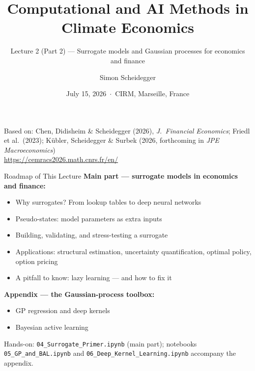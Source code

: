 \documentclass[aspectratio=169,11pt]{beamer}
\title[CEMRACS 2026 $\cdot$ Surrogates]
{Computational and AI Methods in Climate Economics}
\subtitle{Lecture 2 (Part 2) --- Surrogate models and Gaussian processes for economics and finance}
\author{Simon Scheidegger}
\institute{HEC Lausanne $\cdot$ Grantham Research Institute, LSE}
\date{July 15, 2026 \,$\cdot$\, CIRM, Marseille, France}
\newcommand{\emphc}[1]{\textcolor{harvardcrimson}{#1}}
\begin{document}
\newcommand{\exercisepause}{%
  \tikz[baseline=(X.base)]{\node[fill=darkgreen!80!black, text=white,
  rounded corners=2pt, inner sep=3pt, font=\scriptsize\bfseries](X){PAUSE --- 5 min};}}

{
\begin{frame}
\titlepage
\vspace{-0.4cm}
\begin{center}
{\footnotesize Based on: Chen, Didisheim \& Scheidegger (2026), \emph{J.\ Financial Economics}; Friedl et al.\ (2023); K\"ubler, Scheidegger \& Surbek (2026, forthcoming in \emph{JPE Macroeconomics})}\\[8pt]
{\footnotesize \url{https://cemracs2026.math.cnrs.fr/en/}}
\end{center}
\end{frame}
}

\begin{frame}{Roadmap of This Lecture}
\textbf{Main part --- surrogate models in economics and finance:}
\begin{itemize}\itemsep2pt
  \item Why surrogates? From lookup tables to deep neural networks
  \item Pseudo-states: model parameters as extra inputs
  \item Building, validating, and stress-testing a surrogate
  \item Applications: structural estimation, uncertainty quantification, optimal policy, option pricing
  \item A pitfall to know: \emphc{lazy learning} --- and how to fix it
\end{itemize}

\vspace{0.4em}
\textbf{Appendix --- the Gaussian-process toolbox:}
\begin{itemize}\itemsep2pt
  \item GP regression and deep kernels
  \item Bayesian active learning
\end{itemize}

\vspace{0.3em}
\begin{center}
{\scriptsize Hands-on: \texttt{04\_Surrogate\_Primer.ipynb} (main part); notebooks \texttt{05\_GP\_and\_BAL.ipynb} and \texttt{06\_Deep\_Kernel\_Learning.ipynb} accompany the appendix.}
\end{center}
\end{frame}
\end{document}
